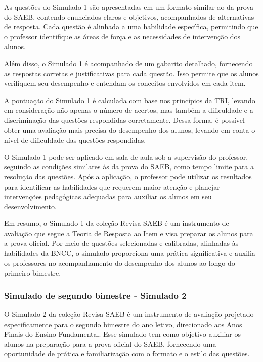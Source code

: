 As questões do Simulado 1 são apresentadas em um formato similar ao da
prova do SAEB, contendo enunciados claros e objetivos, acompanhados de
alternativas de resposta. Cada questão é alinhada a uma habilidade
específica, permitindo que o professor identifique as áreas de força e
as necessidades de intervenção dos alunos.

Além disso, o Simulado 1 é acompanhado de um gabarito detalhado,
fornecendo as respostas corretas e justificativas para cada questão.
Isso permite que os alunos verifiquem seu desempenho e entendam os
conceitos envolvidos em cada item.

A pontuação do Simulado 1 é calculada com base nos princípios da TRI,
levando em consideração não apenas o número de acertos, mas também a
dificuldade e a discriminação das questões respondidas corretamente.
Dessa forma, é possível obter uma avaliação mais precisa do desempenho
dos alunos, levando em conta o nível de dificuldade das questões
respondidas.

O Simulado 1 pode ser aplicado em sala de aula sob a supervisão do
professor, seguindo as condições similares às da prova do SAEB, como
tempo limite para a resolução das questões. Após a aplicação, o
professor pode utilizar os resultados para identificar as habilidades
que requerem maior atenção e planejar intervenções pedagógicas adequadas
para auxiliar os alunos em seu desenvolvimento.

Em resumo, o Simulado 1 da coleção Revisa SAEB é um instrumento de avaliação que segue
a Teoria de Resposta ao Item e visa preparar os alunos para a prova
oficial. Por meio de questões selecionadas e calibradas, alinhadas às
habilidades da BNCC, o simulado proporciona uma prática significativa e
auxilia os professores no acompanhamento do desempenho dos alunos ao
longo do primeiro bimestre.

\subsubsection{Simulado de segundo bimestre - Simulado
2}\label{simulado-de-segundo-bimestre---simulado-2}

O Simulado 2 da coleção Revisa SAEB é um instrumento de avaliação projetado
especificamente para o segundo bimestre do ano letivo, direcionado aos
Anos Finais do Ensino Fundamental. Esse simulado tem como objetivo
auxiliar os alunos na preparação para a prova oficial do SAEB,
fornecendo uma oportunidade de prática e familiarização com o formato e
o estilo das questões.

